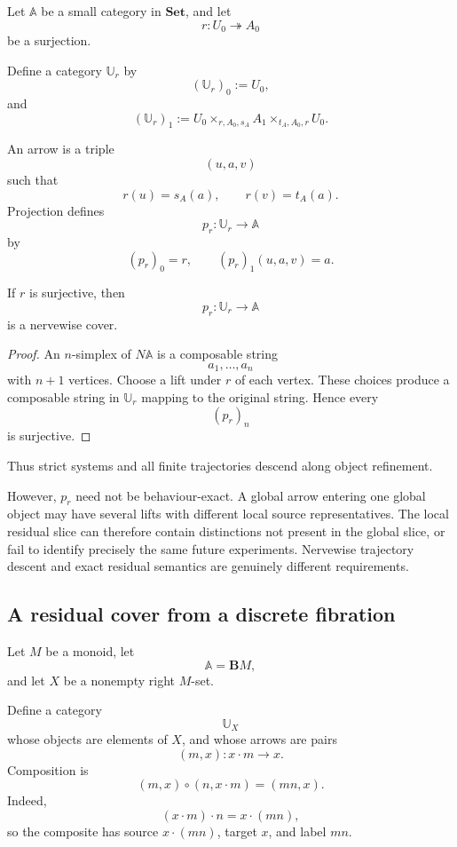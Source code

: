 Let \(\mathbb A\) be a small category in \(\mathbf{Set}\), and let
\[
    r:U_0\twoheadrightarrow A_0
\]
be a surjection.

Define a category \(\mathbb U_r\) by
\[
    (\mathbb U_r)_0:=U_0,
\]
and
\[
    (\mathbb U_r)_1
    :=
    U_0
    \times_{r,A_0,s_A}
    A_1
    \times_{t_A,A_0,r}
    U_0.
\]

An arrow is a triple
\[
    (u,a,v)
\]
such that
\[
    r(u)=s_A(a),
    \qquad
    r(v)=t_A(a).
\]
Projection defines
\[
    p_r:\mathbb U_r\to\mathbb A
\]
by
\[
    (p_r)_0=r,
    \qquad
    (p_r)_1(u,a,v)=a.
\]

\begin{proposition}
\label{prop:object-refinement-covers-nervewise}
If \(r\) is surjective, then
\[
    p_r:\mathbb U_r\to\mathbb A
\]
is a nervewise cover.
\end{proposition}

\begin{proof}
An \(n\)-simplex of \(N\mathbb A\) is a composable string
\[
    a_1,\ldots,a_n
\]
with \(n+1\) vertices. Choose a lift under \(r\) of each vertex. These choices
produce a composable string in \(\mathbb U_r\) mapping to the original
string. Hence every
\[
    (p_r)_n
\]
is surjective.
\end{proof}

Thus strict systems and all finite trajectories descend along object
refinement.

However, \(p_r\) need not be behaviour-exact. A global arrow entering one
global object may have several lifts with different local source
representatives. The local residual slice can therefore contain distinctions
not present in the global slice, or fail to identify precisely the same
future experiments. Nervewise trajectory descent and exact residual semantics
are genuinely different requirements.

\subsection{A residual cover from a discrete fibration}
\label{subsec:example-residual-cover-discrete-fibration}

Let \(M\) be a monoid, let
\[
    \mathbb A=\mathbf BM,
\]
and let \(X\) be a nonempty right \(M\)-set.

Define a category
\[
    \mathbb U_X
\]
whose objects are elements of \(X\), and whose arrows are pairs
\[
    (m,x):
    x\cdot m\to x.
\]
Composition is
\[
    (m,x)\circ(n,x\cdot m)
    =
    (mn,x).
\]
Indeed,
\[
    (x\cdot m)\cdot n
    =
    x\cdot(mn),
\]
so the composite has source \(x\cdot(mn)\), target \(x\), and label \(mn\).

